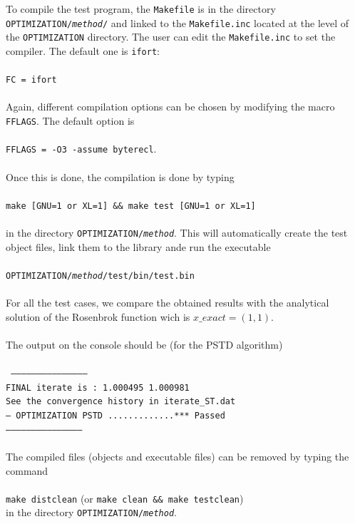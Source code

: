 \documentclass[a4paper,twoside,final,onecolumn,11pt,openright]{article}
\begin{document}
To compile the test program, the \texttt{Makefile} is in the directory \texttt{OPTIMIZATION/\textit{method}/} and linked to the \texttt{Makefile.inc} located at the level of the \texttt{OPTIMIZATION} directory. The user can edit the \texttt{Makefile.inc} to set the compiler. The default one is \texttt{ifort}:
\\
\\
\texttt{FC    =   ifort}
\\
\\
Again, different compilation options can be chosen by modifying the macro \texttt{FFLAGS}. The default option is 
\\
\\
\texttt{FFLAGS  =  -O3 -assume byterecl}. 
\\
\\
Once this is done, the compilation is done by typing 
\\
\\
\texttt{make [GNU=1 or XL=1] \&\& make test [GNU=1 or XL=1]}
\\
\\
in the directory \texttt{OPTIMIZATION/\textit{method}}. This will automatically create the test object files, link them to the library ande run the executable 
\\
\\
\texttt{OPTIMIZATION/\textit{method}/test/bin/test.bin}
\\
\\
For all the test cases, we compare the obtained results with the analytical solution of the Rosenbrok function wich is $x\_exact=(1,1)$.
\\
\\
The output on the console should be (for the PSTD algorithm)
\\
\\
\texttt{
---------------------------------------------\\
 FINAL iterate is :    1.000495       1.000981\\
 See the convergence history in iterate\_ST.dat\\
 --- OPTIMIZATION PSTD .............*** Passed\\
 ---------------------------------------------
}
\\
\\
The compiled files (objects and executable files) can be removed by typing the command
\\
\\
\texttt{make distclean} (or \texttt{make clean \&\& make testclean})
\\
in the directory \texttt{OPTIMIZATION/\textit{method}}.
\end{document}
